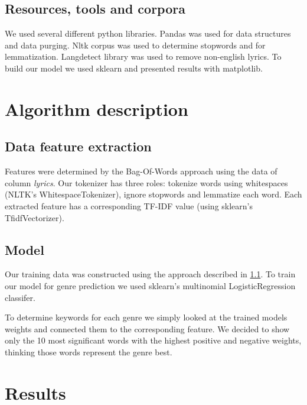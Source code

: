 \documentclass[a4paper,11pt]{article}
\begin{document}
\subsection{Resources, tools and corpora}

We used several different python libraries. Pandas was used for data structures and data purging. Nltk corpus was used to determine stopwords and for lemmatization. Langdetect library was used to remove non-english lyrics. To build our model we used sklearn and presented results with matplotlib.

\pagebreak
\section{Algorithm description}


\subsection{Data feature extraction}
\label{feature-extraction}
Features were determined by the Bag-Of-Words approach using the data of column \textit{lyrics}.
Our tokenizer has three roles: tokenize words using whitespaces (NLTK's WhitespaceTokenizer), ignore stopwords and lemmatize each word.
Each extracted feature has a corresponding TF-IDF value (using sklearn's TfidfVectorizer).

\subsection{Model}
Our training data was constructed using the approach described in \ref{feature-extraction}.
To train our model for genre prediction we used sklearn's multinomial LogisticRegression classifer. 

To determine keywords for each genre we simply looked at the trained models weights and connected them to the corresponding feature.
We decided to show only the 10 most significant words with the highest positive and negative weights, thinking those words represent the genre best.

\section{Results}
\end{document}
